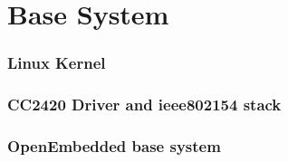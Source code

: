 \chapter{Base System}
\subsection{Linux Kernel}
\subsection{CC2420 Driver and ieee802154 stack}
\subsection{OpenEmbedded base system}
